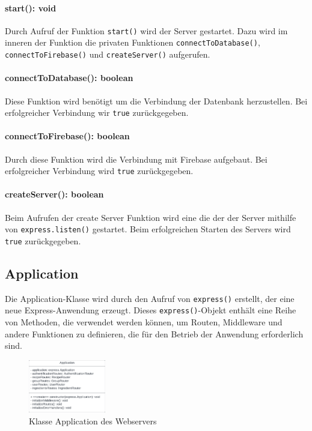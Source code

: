 \documentclass[parskip=full]{scrartcl}
\begin{document}
\paragraph{start(): void}Durch Aufruf der Funktion \texttt{start()} wird der Server gestartet. Dazu wird im inneren der Funktion die privaten Funktionen \texttt{connectToDatabase()}, \texttt{connectToFirebase()} und \texttt{createServer()} aufgerufen.
\paragraph{connectToDatabase(): boolean}Diese Funktion wird benötigt um die Verbindung der Datenbank herzustellen. Bei erfolgreicher Verbindung wir \texttt{true} zurückgegeben.
\paragraph{connectToFirebase(): boolean}Durch diese Funktion wird die Verbindung mit Firebase aufgebaut. Bei erfolgreicher Verbindung wird \texttt{true} zurückgegeben.
\paragraph{createServer(): boolean}Beim Aufrufen der create Server Funktion wird eine die der der Server mithilfe von \texttt{express.listen()} gestartet. Beim erfolgreichen Starten des Servers wird \texttt{true} zurückgegeben.


\subsection{Application}
Die Application-Klasse wird durch den Aufruf von \texttt{express()} erstellt, der eine neue Express-Anwendung erzeugt. Dieses \texttt{express()}-Objekt enthält eine Reihe von Methoden, die verwendet werden können, um Routen, Middleware und andere Funktionen zu definieren, die für den Betrieb der Anwendung erforderlich sind.

\begin{figure}[htp]
    \centering
    \includegraphics[width = 0.3\textwidth]{images/webserver/application.pdf}
    \caption{Klasse Application des Webservers}
    \label{fig:application}
\end{figure}
\end{document}
